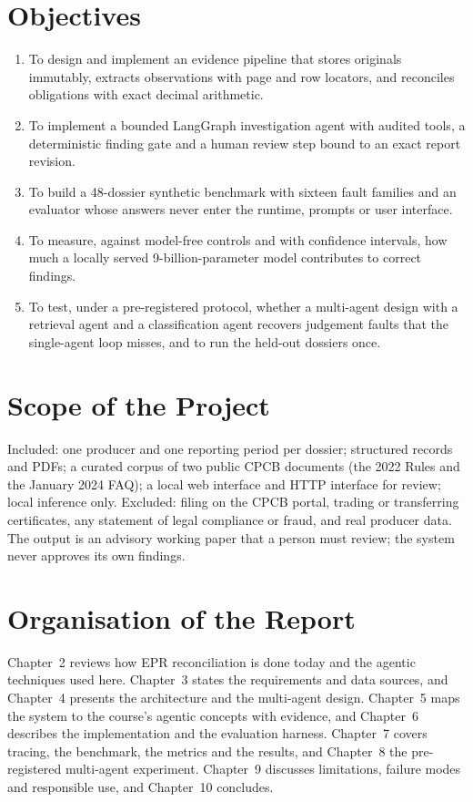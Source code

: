 \section{Objectives}
\begin{enumerate}[itemsep=2pt]
\item To design and implement an evidence pipeline that stores originals immutably, extracts
observations with page and row locators, and reconciles obligations with exact decimal
arithmetic.
\item To implement a bounded LangGraph investigation agent with audited tools, a deterministic
finding gate and a human review step bound to an exact report revision.
\item To build a 48-dossier synthetic benchmark with sixteen fault families and an evaluator whose
answers never enter the runtime, prompts or user interface.
\item To measure, against model-free controls and with confidence intervals, how much a locally
served 9-billion-parameter model contributes to correct findings.
\item To test, under a pre-registered protocol, whether a multi-agent design with a retrieval
agent and a classification agent recovers judgement faults that the single-agent loop misses,
and to run the held-out dossiers once.
\end{enumerate}

\section{Scope of the Project}
Included: one producer and one reporting period per dossier; structured records and PDFs;
a curated corpus of two public CPCB documents (the 2022 Rules and the January 2024 FAQ); a local
web interface and HTTP interface for review; local inference only. Excluded: filing on the CPCB
portal, trading or transferring certificates, any statement of legal compliance or fraud, and
real producer data. The output is an advisory working paper that a person must review; the system
never approves its own findings.

\section{Organisation of the Report}
Chapter~2 reviews how EPR reconciliation is done today and the agentic techniques used here.
Chapter~3 states the requirements and data sources, and Chapter~4 presents the architecture and
the multi-agent design. Chapter~5 maps the system to the course's agentic concepts with evidence,
and Chapter~6 describes the implementation and the evaluation harness. Chapter~7 covers tracing,
the benchmark, the metrics and the results, and Chapter~8 the pre-registered multi-agent
experiment. Chapter~9 discusses limitations, failure modes and responsible use, and Chapter~10
concludes.
